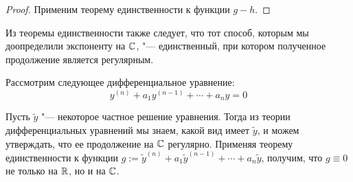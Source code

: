 \begin{proof}
	Применим теорему единственности к функции $g - h$.
\end{proof}

\begin{unnecessary}
    \begin{note}
    	Из теоремы единственности также следует, что тот способ, которым мы доопределили экспоненту на $\mathbb{C}$, "--- единственный, при котором полученное продолжение является регулярным.
    \end{note}

    \begin{example}
    	Рассмотрим следующее дифференциальное уравнение:
    	\[y^{(n)} + a_1y^{(n-1)} + \dotsb + a_ny = 0\]
    	
    	Пусть $\widetilde y$ "--- некоторое частное решение уравнения. Тогда из теории дифференциальных уравнений мы знаем, какой вид имеет $\widetilde y$, и можем утверждать, что ее продолжение на $\mathbb{C}$ регулярно. Применяя теорему единственности к функции $g := \widetilde y^{(n)} + a_1\widetilde y^{(n-1)} + \dotsb + a_n\widetilde y$, получим, что $g \equiv 0$ не только на $\mathbb{R}$, но и на $\mathbb{C}$.
    \end{example}
\end{unnecessary}